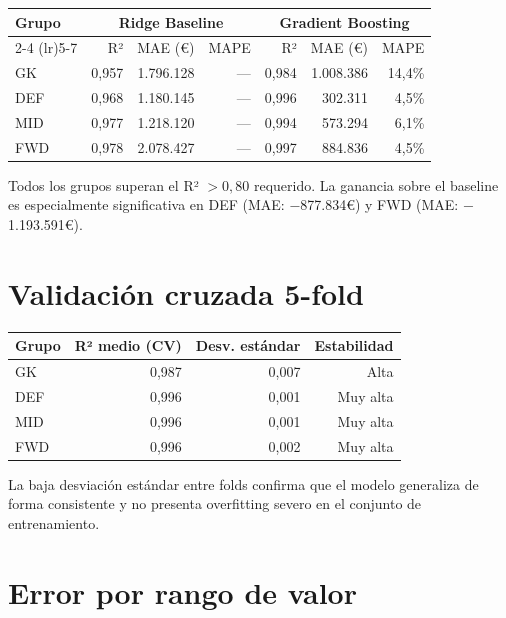 \documentclass[12pt,a4paper]{report}
\begin{document}
\begin{center}
\begin{tabular}{lrrrrrr}
\toprule
\multirow{2}{*}{\textbf{Grupo}} & \multicolumn{3}{c}{\textbf{Ridge Baseline}} & \multicolumn{3}{c}{\textbf{Gradient Boosting}} \\
\cmidrule(lr){2-4} \cmidrule(lr){5-7}
 & R² & MAE (€) & MAPE & R² & MAE (€) & MAPE \\
\midrule
GK  & 0{,}957 & 1.796.128 & --- & 0{,}984 & 1.008.386 & 14{,}4\% \\
DEF & 0{,}968 & 1.180.145 & --- & 0{,}996 &   302.311 &  4{,}5\% \\
MID & 0{,}977 & 1.218.120 & --- & 0{,}994 &   573.294 &  6{,}1\% \\
FWD & 0{,}978 & 2.078.427 & --- & 0{,}997 &   884.836 &  4{,}5\% \\
\bottomrule
\end{tabular}
\end{center}

Todos los grupos superan el R² $> 0{,}80$ requerido. La ganancia sobre el baseline es especialmente significativa en DEF (MAE: $-$877.834€) y FWD (MAE: $-$1.193.591€).

\section{Validación cruzada 5-fold}

\begin{center}
\begin{tabular}{lrrr}
\toprule
\textbf{Grupo} & \textbf{R² medio (CV)} & \textbf{Desv. estándar} & \textbf{Estabilidad} \\
\midrule
GK  & 0{,}987 & 0{,}007 & Alta \\
DEF & 0{,}996 & 0{,}001 & Muy alta \\
MID & 0{,}996 & 0{,}001 & Muy alta \\
FWD & 0{,}996 & 0{,}002 & Muy alta \\
\bottomrule
\end{tabular}
\end{center}

La baja desviación estándar entre folds confirma que el modelo generaliza de forma consistente y no presenta overfitting severo en el conjunto de entrenamiento.

\section{Error por rango de valor}
\end{document}
